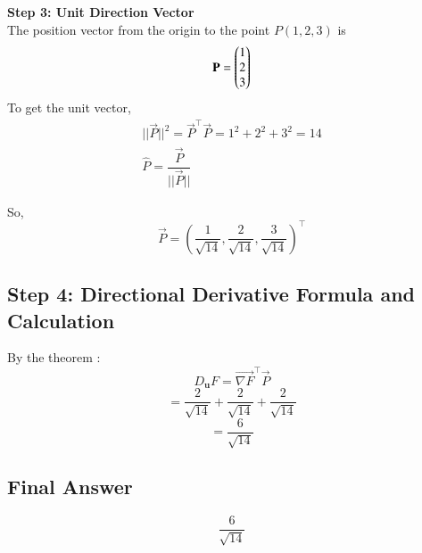 \documentclass[journal,12pt,onecolumn]{IEEEtran}
\begin{document}
\textbf{Step 3: Unit Direction Vector}
\\
The position vector from the origin to the point \(P(1,2,3)\) is
\begin{align*}
    \mathbf{P}= \begin{pmatrix}1\\2\\3\end{pmatrix}
\end{align*}
To get the unit vector,
\begin{align*}
||\vec{P}||^2 =\vec{P}^\top\vec{P}=1^2 + 2^2 + 3^2 = {14} 
\\
\hat{P}=\dfrac{\vec{P}}{||\vec{P}||}
\end{align*}

So,
\[
\vec{P} = \left(\frac{1}{\sqrt{14}}, \frac{2}{\sqrt{14}}, \frac{3}{\sqrt{14}}\right)^\top
\]

\subsection*{Step 4: Directional Derivative Formula and Calculation}

By the theorem :
\[
D_{\mathbf{u}} F = \vec{{\nabla F}}^\top  \vec{P}
\]
\[
=  \frac{2}{\sqrt{14}} + \frac{2}{\sqrt{14}} +  \frac{2}{\sqrt{14}}
\]
\[
= \frac{6}{\sqrt{14}}
\]

\subsection*{Final Answer}
\[
\boxed{ \frac{6}{\sqrt{14}} }
\]
\end{document}
